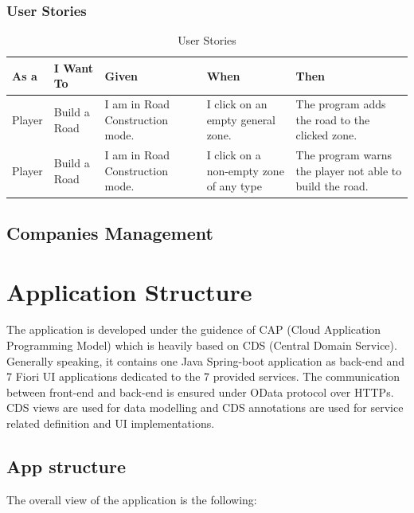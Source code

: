 \subsubsection{User Stories}

\begin{table}[h]
\centering
\begin{tabular}{|p{2cm}|p{2.7cm}|p{2.7cm}|p{2.7cm}|p{2.7cm}|}
\hline
\textbf{As a} & \textbf{I Want To} & \textbf{Given} & \textbf{When} & \textbf{Then}\\
\hline
Player & Build a Road & I am in Road Construction mode. & I click on an empty general zone. & The program adds the road to the clicked zone. \\
\hline
Player & Build a Road & I am in Road Construction mode. & I click on a non-empty zone of any type & The program warns the player not able to build the road. \\
\hline
\end{tabular}
\caption{User Stories}
\end{table}

\subsection{Companies Management}



\section{Application Structure}

The application is developed under the guidence of CAP (Cloud Application Programming Model) which is heavily based on CDS (Central Domain Service). Generally speaking, it contains one Java Spring-boot application as back-end and 7 Fiori UI applications dedicated to the 7 provided services. The communication between front-end and back-end is ensured under OData protocol over HTTPs. CDS views are used for data modelling and CDS annotations are used for service related definition and UI implementations.

\subsection{App structure}

The overall view of the application is the following:

